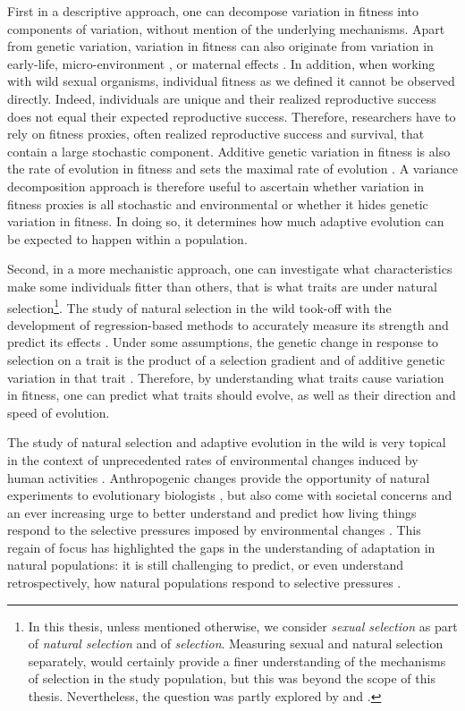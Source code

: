 First in a descriptive approach, one can decompose variation in fitness into components of variation, without mention of the underlying mechanisms.
Apart from genetic variation, variation in fitness can also originate from variation in early-life, micro-environment \parencite{Turner2009}, or maternal effects \parencite{Wolf2009}. In addition, when working with wild sexual organisms, individual fitness as we defined it cannot be observed directly. Indeed, individuals are unique and their realized reproductive success does not equal their expected reproductive success. Therefore, researchers have to rely on fitness proxies, often realized reproductive success and survival, that contain a large stochastic component. Additive genetic variation in fitness is also the rate of evolution in fitness and sets the maximal rate of evolution \parencite{Fisher1930}. A variance decomposition approach is therefore useful to ascertain whether variation in fitness proxies is all stochastic and environmental or whether it hides genetic variation in fitness. In doing so, it determines how much adaptive evolution can be expected to happen within a population.

Second, in a more mechanistic approach, one can investigate what characteristics make some individuals fitter than others, that is what traits are under natural selection\footnote{In this thesis, unless mentioned otherwise, we consider \emph{sexual selection} as part of \emph{natural selection} and of \emph{selection}. Measuring sexual and natural selection separately, would certainly provide a finer understanding of the mechanisms of selection in the study population, but this was beyond the scope of this thesis. Nevertheless, the question was partly explored by \cite{Garcia-Navas2016} and \cite{Garcia-Navas2015a}.}. The study of natural selection in the wild took-off with the development of regression-based methods to accurately measure its strength and predict its effects \parencite{Lande1979, Lande1983}. Under some assumptions, the genetic change in response to selection on a trait is the product of a selection gradient and of additive genetic variation in that trait \parencite{Lush1937}. Therefore, by understanding what traits cause variation in fitness, one can predict what traits should evolve, as well as their direction and speed of evolution. 

The study of natural selection and adaptive evolution in the wild is very topical in the context of unprecedented rates of environmental changes induced by human activities \parencite{parmesan2006}. Anthropogenic changes provide the opportunity of natural experiments to evolutionary biologists \parencite{Altermatt2016, Brookfield2016}, but also come with societal concerns and an ever increasing urge to better understand and predict how living things respond to the selective pressures imposed by environmental changes \parencite{McCarty2001, Shaw2013}. This regain of focus has highlighted the gaps in the understanding of adaptation in natural populations: it is still challenging to predict, or even understand retrospectively, how natural populations respond to selective pressures \parencite{Merila2001, Tafani2013, Shaw2013, Brookfield2016}.

